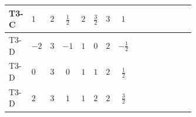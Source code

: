 \documentclass[8pt]{article}
\begin{document}
\begin{landscape}
\begin{longtable}{@{}llcccccc >{\raggedright\arraybackslash}p{0.21\linewidth} >{\raggedright\arraybackslash}p{0.21\linewidth} >{\raggedright\arraybackslash}p{0.21\linewidth}@{}}
\midrule
T3-C & $1$ & $2$ & $\frac{1}{2}$ & $2$ & $\frac{3}{2}$ & $3$ & $1$ & \scriptsize\adjustbox{max width=\linewidth}{$\begin{gathered} +2 {\lambda_1} {\lambda_{HS_1}^{(A)}}\end{gathered}$} & \scriptsize\adjustbox{max width=\linewidth}{$\begin{gathered} +8 {\lambda_{HS_1}^{(1)}} {\lambda_{HS_1}^{(A)}}\end{gathered}$} & \scriptsize\adjustbox{max width=\linewidth}{$\begin{gathered} +2 {\lambda_{HS_1}^{(A)}} {\lambda_{S_1}^{(1)}}\end{gathered}$} \\
\midrule
T3-D & $-2$ & $3$ & $-1$ & $1$ & $0$ & $2$ & $-\frac{1}{2}$ & \scriptsize\adjustbox{max width=\linewidth}{$\begin{gathered} +2 {\lambda_1} {\lambda_{HS_1}^{(A)}}\end{gathered}$} & \scriptsize\adjustbox{max width=\linewidth}{$\begin{gathered} +8 {\lambda_{HS_1}^{(1)}} {\lambda_{HS_1}^{(A)}}\end{gathered}$} & \scriptsize\adjustbox{max width=\linewidth}{$\begin{gathered} +2 {\lambda_{HS_1}^{(A)}} {\lambda_{S_1}^{(1)}}\end{gathered}$} \\
\midrule
T3-D & $0$ & $3$ & $0$ & $1$ & $1$ & $2$ & $\frac{1}{2}$ & \scriptsize\adjustbox{max width=\linewidth}{$\begin{gathered} +2 {\lambda_1} {\lambda_{HS_1}^{(A)}}\end{gathered}$} & \scriptsize\adjustbox{max width=\linewidth}{$\begin{gathered} +8 {\lambda_{HS_1}^{(1)}} {\lambda_{HS_1}^{(A)}}\end{gathered}$} & \scriptsize\adjustbox{max width=\linewidth}{$\begin{gathered} +2 {\lambda_{HS_1}^{(A)}} {\lambda_{S_1}^{(1)}}\end{gathered}$} \\
\midrule
T3-D & $2$ & $3$ & $1$ & $1$ & $2$ & $2$ & $\frac{3}{2}$ & \scriptsize\adjustbox{max width=\linewidth}{$\begin{gathered} +2 {\lambda_1} {\lambda_{HS_1}^{(A)}}\end{gathered}$} & \scriptsize\adjustbox{max width=\linewidth}{$\begin{gathered} +8 {\lambda_{HS_1}^{(1)}} {\lambda_{HS_1}^{(A)}}\end{gathered}$} & \scriptsize\adjustbox{max width=\linewidth}{$\begin{gathered} +2 {\lambda_{HS_1}^{(A)}} {\lambda_{S_1}^{(1)}}\end{gathered}$} \\

\end{longtable}
\end{landscape}
\end{document}

